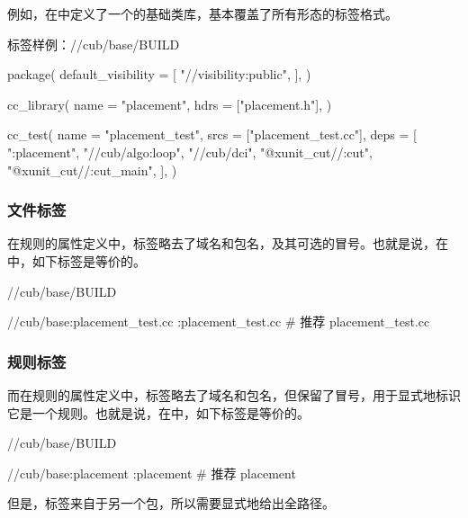 \begin{content}
例如，在中定义了一个的基础类库，基本覆盖了所有形态的标签格式。

\begin{nodiff}{标签样例：//cub/base/BUILD}
 \begin{python}
package(
    default_visibility = [    
        "//visibility:public",    
    ],
)

cc_library(
    name = "placement",
    hdrs = ["placement.h"],
)

cc_test(
    name = "placement_test",
    srcs = ["placement_test.cc"],
    deps = [ 
        ":placement",
        "//cub/algo:loop",
        "//cub/dci",      
        "@xunit_cut//:cut",
        "@xunit_cut//:cut_main",
    ],  
)
 \end{python}
\end{nodiff}

\subsubsection{文件标签}

在规则的属性定义中，标签略去了域名和包名，及其可选的冒号。也就是说，在中，如下标签是等价的。

\begin{nodiff}{//cub/base/BUILD}
 \begin{python}
//cub/base:placement_test.cc
:placement_test.cc # 推荐
placement_test.cc
 \end{python}
\end{nodiff}

\subsubsection{规则标签}

而在规则的属性定义中，标签略去了域名和包名，但保留了冒号，用于显式地标识它是一个规则。也就是说，在中，如下标签是等价的。

\begin{nodiff}{//cub/base/BUILD}
 \begin{python}
//cub/base:placement
:placement  # 推荐
placement
 \end{python}
\end{nodiff}

但是，标签来自于另一个包，所以需要显式地给出全路径。


\end{content}
